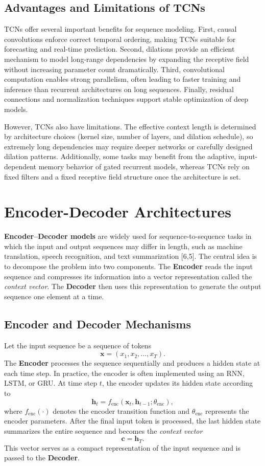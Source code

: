 \documentclass{article}
\renewcommand{\cite}[1]{[#1]}
\begin{document}
\subsection{Advantages and Limitations of TCNs}

TCNs offer several important benefits for sequence modeling. First, causal convolutions enforce correct temporal ordering, making TCNs suitable for forecasting and real-time prediction. Second, dilations provide an efficient mechanism to model long-range dependencies by expanding the receptive field without increasing parameter count dramatically. Third, convolutional computation enables strong parallelism, often leading to faster training and inference than recurrent architectures on long sequences. Finally, residual connections and normalization techniques support stable optimization of deep models.

However, TCNs also have limitations. The effective context length is determined by architecture choices (kernel size, number of layers, and dilation schedule), so extremely long dependencies may require deeper networks or carefully designed dilation patterns. Additionally, some tasks may benefit from the adaptive, input-dependent memory behavior of gated recurrent models, whereas TCNs rely on fixed filters and a fixed receptive field structure once the architecture is set.

\section{Encoder-Decoder Architectures}

\textbf{Encoder--Decoder models} are widely used for sequence-to-sequence tasks in which the input and output sequences may differ in length, such as machine translation, speech recognition, and text summarization \cite{6,5}. The central idea is to decompose the problem into two components. The \textbf{Encoder} reads the input sequence and compresses its information into a vector representation called the \emph{context vector}. The \textbf{Decoder} then uses this representation to generate the output sequence one element at a time.

\subsection{Encoder and Decoder Mechanisms}

Let the input sequence be a sequence of tokens
\[
\mathbf{x} = (x_1, x_2, \dots, x_T).
\]
The \textbf{Encoder} processes the sequence sequentially and produces a hidden state at each time step. In practice, the encoder is often implemented using an RNN, LSTM, or GRU. At time step $t$, the encoder updates its hidden state according to
\[
\mathbf{h}_t = f_{\text{enc}}(\mathbf{x}_t, \mathbf{h}_{t-1}; \theta_{\text{enc}}),
\]
where $f_{\text{enc}}(\cdot)$ denotes the encoder transition function and $\theta_{\text{enc}}$ represents the encoder parameters. After the final input token is processed, the last hidden state summarizes the entire sequence and becomes the \emph{context vector}
\[
\mathbf{c} = \mathbf{h}_T.
\]
This vector serves as a compact representation of the input sequence and is passed to the \textbf{Decoder}.
\end{document}
